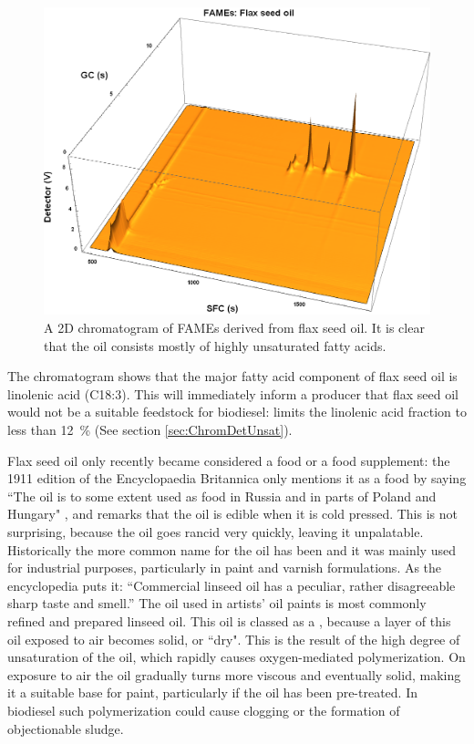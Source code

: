 \begin{figure}
\centering
\includegraphics[width=\textwidth]{Figures/Flax44.png}
\decoRule

\caption[SFC×GC of flax seed oil]{A 2D chromatogram of FAMEs derived from
flax seed oil. It is clear that the oil consists mostly of highly unsaturated fatty
acids.}

\label{fig:2DFlax}
\end{figure}

The chromatogram shows that the major fatty acid component of flax seed oil is
linolenic acid (C18:3). This will immediately inform a producer that flax seed
oil would not be a suitable feedstock for biodiesel:  limits the
linolenic acid fraction to less than \SI{12}{\percent} (See section
\ref{sec:ChromDetUnsat}).

Flax seed oil only recently became considered a food or a food supplement: the
1911 edition of the Encyclopaedia Britannica only mentions it as a food by
saying ``The oil is to some extent used as food in Russia and in parts of Poland
and Hungary" \autocite{Linseed1911}, and remarks that the oil is edible when it
is cold pressed. This is not surprising, because the oil goes rancid very
quickly, leaving it unpalatable. Historically the more common name for the oil
has been  and it was mainly used for industrial purposes,
particularly in paint and varnish formulations. As the encyclopedia puts it:
``Commercial linseed oil has a peculiar, rather disagreeable sharp taste and
smell.'' The oil used in artists' oil paints is most commonly refined and
prepared linseed oil. This oil is classed as a , because a
layer of this oil exposed to air becomes solid, or ``dry". This is the result of
the high degree of unsaturation of the oil, which rapidly causes oxygen-mediated
polymerization. On exposure to air the oil gradually turns more viscous and
eventually solid, making it a suitable base for paint, particularly if the oil
has been pre-treated. In biodiesel such polymerization could cause clogging or
the formation of objectionable sludge.

